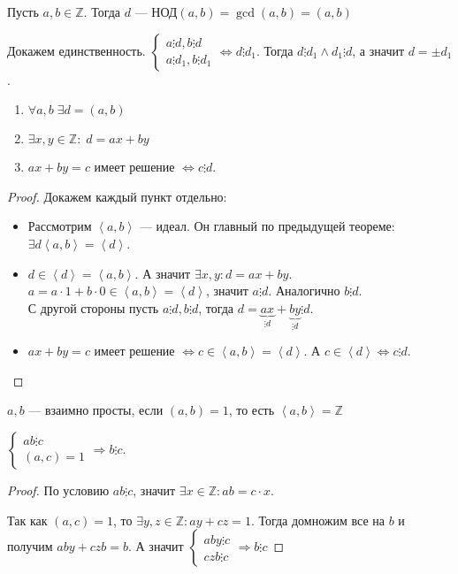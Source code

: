 \begin{definition}
    Пусть $a, b \in \mathbb{Z}$. Тогда $d$ ---  $\text{НОД}(a,b) = \gcd(a,b) = (a, b)$ 
\end{definition}
Докажем единственность. $\begin{cases}a \vdots d, b \vdots d \\ a \vdots d_1, b \vdots d_1\end{cases} \iff d \vdots d_1$. Тогда $d \vdots d_1 \land d_1 \vdots d$, а значит $d = \pm d_1$. 
\begin{theorem}
   \begin{enumerate}
       \item $\forall a, b\; \exists d = (a,b)$
       \item  $\exists x, y \in \mathbb{Z}:\; d = ax +by$
       \item  $ax + by = c \text{ имеет решение } \iff c \vdots d$.
   \end{enumerate} 
\end{theorem}
\begin{proof}
    Докажем каждый пункт отдельно:
    \begin{itemize}
        \item
            Рассмотрим $\left<a, b\right>$ --- идеал. Он главный по предыдущей теореме:  $\exists d \left<a, b\right> = \left<d\right>$. \\
        \item
            $d \in \left<d\right> = \left<a, b\right>$. А значит  $\exists x, y: d = ax+by$.\\
            $a = a \cdot 1 + b \cdot 0 \in \left<a, b\right> = \left<d\right>$, значит $a \vdots d$. Аналогично  $b \vdots d$. \\
        С другой стороны пусть  $a \vdots d, b \vdots d$, тогда  $d = \underbrace{ax}_{\vdots d} + \underbrace{by}_{\vdots d} \vdots d$. \\
        \item
            $ax + by = c$ имеет решение  $\iff c \in \left<a,b\right> = \left<d\right>$. А  $c \in \left<d\right> \iff c \vdots d$.
    \end{itemize}
\end{proof}
\begin{definition}
    $a, b$ --- взаимно просты, если  $(a, b) = 1$, то есть  $\left<a, b\right> = \mathbb{Z}$
\end{definition}
\begin{lemma}
    $\begin{cases} ab \vdots c \\ (a,c) = 1 \end{cases} \Rightarrow b \vdots c$.
\end{lemma}
\begin{proof}
    \par 
    По условию $ab \vdots c$, значит $\exists x \in \mathbb{Z}: ab = c \cdot x$.

    Так как $(a, c) = 1$, то $\exists y, z \in \mathbb{Z}: ay + cz = 1$. Тогда домножим все на $b$ и получим $aby + czb = b$. А значит $\begin{cases} aby \vdots c \\ czb \vdots c \end{cases} \Rightarrow b \vdots c$
\end{proof}
